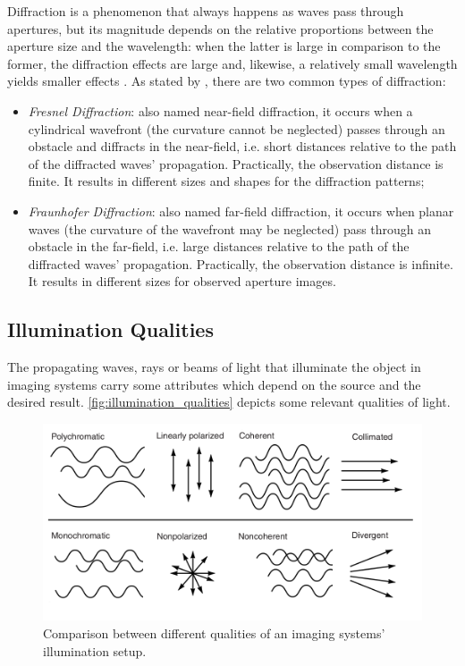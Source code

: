 Diffraction is a phenomenon that always happens as waves pass through apertures, but its magnitude depends on the relative proportions between the aperture size and the wavelength: when the latter is large in comparison to the former, the diffraction effects are large and, likewise, a relatively small wavelength yields smaller effects \cite{tipler2007physics}. As stated by , there are two common types of diffraction:

\begin{itemize}
    \item \emph{Fresnel Diffraction}: also named near-field diffraction, it occurs when a cylindrical wavefront (the curvature cannot be neglected) passes through an obstacle and diffracts in the near-field, i.e. short distances relative to the path of the diffracted waves' propagation. Practically, the observation distance is finite. It results in different sizes and shapes for the diffraction patterns;
    
    \item \emph{Fraunhofer Diffraction}: also named far-field diffraction, it occurs when planar waves (the curvature of the wavefront may be neglected) pass through an obstacle in the far-field, i.e. large distances relative to the path of the diffracted waves' propagation. Practically, the observation distance is infinite. It results in different sizes for observed aperture images.
    
\end{itemize}


\subsection{Illumination Qualities}

The propagating waves, rays or beams of light that illuminate the object in imaging systems carry some attributes which depend on the source and the desired result. \autoref{fig:illumination_qualities} depicts some relevant qualities of light. 


\begin{figure}[htb]
	\centering
	\caption{\label{fig:illumination_qualities} Comparison between different qualities of an imaging systems' illumination setup.}
	\begin{center}
	    \includegraphics[scale=0.4]{images/light_qualities.png}
	\end{center}
	\centering
\end{figure}

